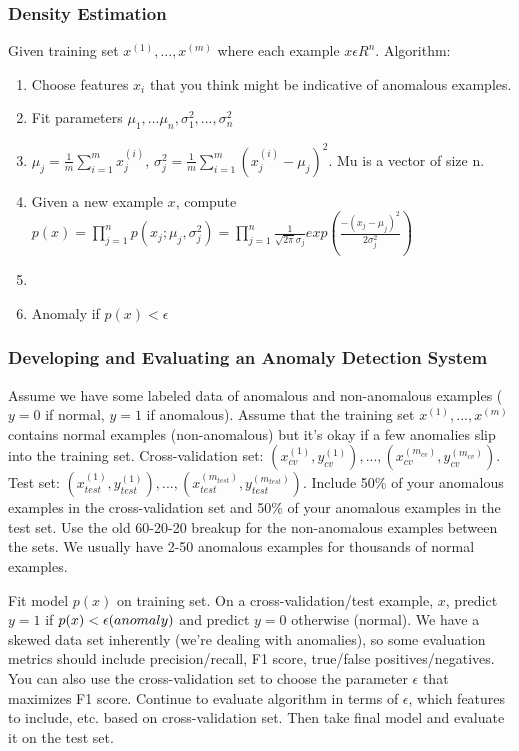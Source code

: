 \documentclass[11pt,letterpaper]{article}
\begin{document}
\subsubsection{Density Estimation}
Given training set $x^{(1)},...,x^{(m)}$ where each example $x \epsilon R^n$. Algorithm:
\begin{enumerate}
	\item Choose features $x_i$ that you think might be indicative of anomalous examples.
	\item Fit parameters $\mu_1,...\mu_n, \sigma^2_1,...,\sigma^2_n$
	\item $\mu_j = \frac{1}{m}\sum_{i=1}^{m}x_j^{(i)}$, $\sigma^2_j = \frac{1}{m}\sum_{i=1}^{m}(x_j^{(i)} - \mu_j)^2$. Mu is a vector of size n.
	\item Given a new example $x$, compute $p(x) = \prod_{j=1}^np(x_j;\mu_j,\sigma^2_j) = \prod_{j=1}^n \frac{1}{\sqrt{2\pi}\sigma_j}exp(\frac{-(x_j-\mu_j)^2 } {2 \sigma_j^2 })$
	\item 
	\item Anomaly if $p(x) < \epsilon$
\end{enumerate}

\subsubsection{Developing and Evaluating an Anomaly Detection System}
Assume we have some labeled data of anomalous and non-anomalous examples ($y = 0$ if normal, $y=1$ if anomalous). Assume that the training set $x^{(1)},...,x^{(m)}$ contains normal examples (non-anomalous) but it's okay if a few anomalies slip into the training set. Cross-validation set: $(x_{cv}^{(1)},y_{cv}^{(1)}),...,(x_{cv}^{(m_{cv})},y_{cv}^{(m_{cv})})$. Test set: $(x_{test}^{(1)},y_{test}^{(1)}),...,(x_{test}^{(m_{test})},y_{test}^{(m_{test})})$. Include 50\% of your anomalous examples in the cross-validation set and 50\% of your anomalous examples in the test set. Use the old 60-20-20 breakup for the non-anomalous examples between the sets. We usually have 2-50 anomalous examples for thousands of normal examples.

Fit model $p(x)$ on training set. On a cross-validation/test example, $x$, predict $y = 1$ if $p(x) < \epsilon \textrm( anomaly )$ and predict $y = 0$ otherwise (normal). We have a skewed data set inherently (we're dealing with anomalies), so some evaluation metrics should include precision/recall, F1 score, true/false positives/negatives. You can also use the cross-validation set to choose the parameter $\epsilon$ that maximizes F1 score. Continue to evaluate algorithm in terms of $\epsilon$, which features to include, etc. based on cross-validation set. Then take final model and evaluate it on the test set.
\end{document}

